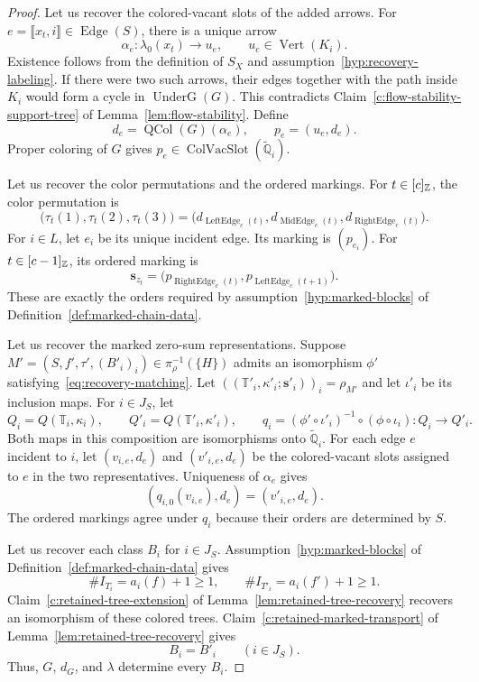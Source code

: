 \begin{proof}
Let us recover the colored-vacant slots of the added arrows.
For $e=\llbracket x_t,i\rrbracket\in\operatorname{Edge}(S)$, there is a unique arrow
\[
 \alpha_e:\lambda_0(x_t)\longrightarrow u_e,\qquad
 u_e\in\operatorname{Vert}(K_i).
\]
Existence follows from the definition of $S_X$ and assumption~\ref{hyp:recovery-labeling}.
If there were two such arrows, their edges together with the path inside $K_i$ would form a cycle in $\operatorname{UnderG}(G)$.
This contradicts Claim~\ref{c:flow-stability-support-tree} of Lemma~\ref{lem:flow-stability}.
Define
\[
 d_e=\operatorname{QCol}(G)(\alpha_e),\qquad p_e=(u_e,d_e).
\]
Proper coloring of $G$ gives $p_e\in\operatorname{ColVacSlot}(\widetilde{\mathbb Q}_i)$.

Let us recover the color permutations and the ordered markings.
For $t\in[c]_{\mathbb Z}$, the color permutation is
\[
 \bigl(\tau_t(1),\tau_t(2),\tau_t(3)\bigr)
 =\bigl(d_{\operatorname{LeftEdge}_c(t)},
 d_{\operatorname{MidEdge}_c(t)},d_{\operatorname{RightEdge}_c(t)}\bigr).
\]
For $i\in L$, let $e_i$ be its unique incident edge. Its marking is $(p_{e_i})$.
For $t\in[c-1]_{\mathbb Z}$, its ordered marking is
\[
 \mathbf s_{z_t}
 =\bigl(p_{\operatorname{RightEdge}_c(t)},p_{\operatorname{LeftEdge}_c(t+1)}\bigr).
\]
These are exactly the orders required by assumption~\ref{hyp:marked-blocks} of Definition~\ref{def:marked-chain-data}.

Let us recover the marked zero-sum representations.
Suppose $M'=(S,f',\tau',(B'_i)_i)\in\pi_\rho^{-1}(\{H\})$ admits an isomorphism $\phi'$ satisfying~\eqref{eq:recovery-matching}.
Let $((\mathbb T'_i,\kappa'_i;\mathbf s'_i))_i=\rho_{M'}$ and let $\iota'_i$ be its inclusion maps.
For $i\in J_S$, let
\[
 Q_i=Q(\mathbb T_i,\kappa_i),\qquad Q'_i=Q(\mathbb T'_i,\kappa'_i),\qquad
 q_i=(\phi'\circ\iota'_i)^{-1}\circ(\phi\circ\iota_i):Q_i\longrightarrow Q'_i.
\]
Both maps in this composition are isomorphisms onto $\widetilde{\mathbb Q}_i$.
For each edge $e$ incident to $i$, let $(v_{i,e},d_e)$ and $(v'_{i,e},d_e)$ be the colored-vacant slots assigned to $e$ in the two representatives.
Uniqueness of $\alpha_e$ gives
\[
 (q_{i,0}(v_{i,e}),d_e)=(v'_{i,e},d_e).
\]
The ordered markings agree under $q_i$ because their orders are determined by $S$.

Let us recover each class $B_i$ for $i\in J_S$.
Assumption~\ref{hyp:marked-blocks} of Definition~\ref{def:marked-chain-data} gives
\[
 \#I_{T_i}=a_i(f)+1\ge1,\qquad
 \#I_{T'_i}=a_i(f')+1\ge1.
\]
Claim~\ref{c:retained-tree-extension} of Lemma~\ref{lem:retained-tree-recovery} recovers an isomorphism of these colored trees.
Claim~\ref{c:retained-marked-transport} of Lemma~\ref{lem:retained-tree-recovery} gives
\[
 B_i=B'_i\qquad(i\in J_S).
\]
Thus, $G$, $d_G$, and $\lambda$ determine every $B_i$.


\end{proof}
